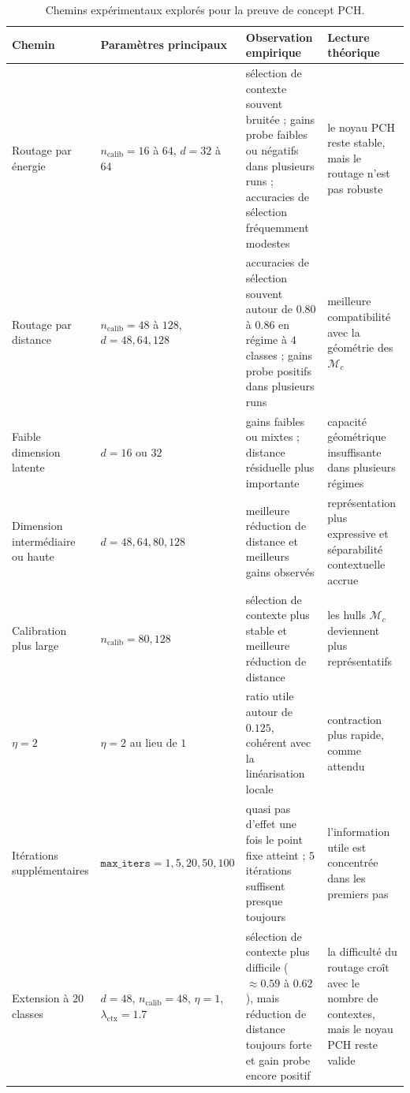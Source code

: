 \documentclass[11pt,a4paper]{article}
\newcommand{\1}{\mathbf 1}
\begin{document}
\begin{table}[ht]
\centering
\small
\begin{tabular}{p{3.2cm}p{3.4cm}p{4.4cm}p{4.4cm}}
\toprule
Chemin & Paramètres principaux & Observation empirique & Lecture théorique \\
\midrule
Routage par énergie &
\(n_{\mathrm{calib}}=16\) à \(64\), \(d=32\) à \(64\) &
sélection de contexte souvent bruitée ; gains probe faibles ou négatifs dans plusieurs runs ; accuracies de sélection fréquemment modestes &
le noyau PCH reste stable, mais le routage n’est pas robuste \\
Routage par distance &
\(n_{\mathrm{calib}}=48\) à \(128\), \(d=48,64,128\) &
accuracies de sélection souvent autour de \(0.80\) à \(0.86\) en régime à \(4\) classes ; gains probe positifs dans plusieurs runs &
meilleure compatibilité avec la géométrie des \(\mathcal M_c\) \\
Faible dimension latente &
\(d=16\) ou \(32\) &
gains faibles ou mixtes ; distance résiduelle plus importante &
capacité géométrique insuffisante dans plusieurs régimes \\
Dimension intermédiaire ou haute &
\(d=48,64,80,128\) &
meilleure réduction de distance et meilleurs gains observés &
représentation plus expressive et séparabilité contextuelle accrue \\
Calibration plus large &
\(n_{\mathrm{calib}}=80,128\) &
sélection de contexte plus stable et meilleure réduction de distance &
les hulls \(\mathcal M_c\) deviennent plus représentatifs \\
\(\eta=2\) &
\(\eta=2\) au lieu de \(1\) &
ratio utile autour de \(0.125\), cohérent avec la linéarisation locale &
contraction plus rapide, comme attendu \\
Itérations supplémentaires &
\(\texttt{max\_iters}=1,5,20,50,100\) &
quasi pas d’effet une fois le point fixe atteint ; \(5\) itérations suffisent presque toujours &
l’information utile est concentrée dans les premiers pas \\
Extension à \(20\) classes &
\(d=48\), \(n_{\mathrm{calib}}=48\), \(\eta=1\), \(\lambda_{\mathrm{ctx}}=1.7\) &
sélection de contexte plus difficile (\(\approx 0.59\) à \(0.62\)), mais réduction de distance toujours forte et gain probe encore positif &
la difficulté du routage croît avec le nombre de contextes, mais le noyau PCH reste valide \\
\bottomrule
\end{tabular}
\caption{Chemins expérimentaux explorés pour la preuve de concept PCH.}
\label{tab:pch_paths}
\end{table}
\end{document}
